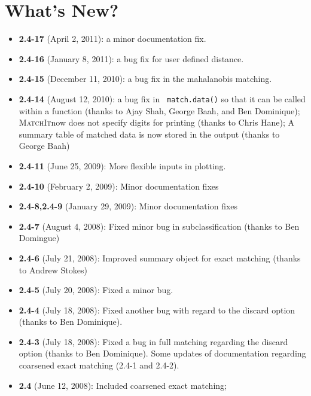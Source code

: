 \documentclass[oneside,letterpaper,12pt]{book}
\newcommand{\MatchIt}{\textsc{MatchIt}}
\begin{document}









\chapter{What's New?}

\begin{itemize}
\item \textbf{2.4-17} (April 2, 2011): a minor documentation fix.
\item \textbf{2.4-16} (January 8, 2011): a bug fix for user defined distance.
\item \textbf{2.4-15} (December 11, 2010): a bug fix in the
  mahalanobis matching.
\item \textbf{2.4-14} (August 12, 2010): a bug fix in {\tt
    match.data()} so that it can be called within a function (thanks
  to Ajay Shah, George Baah, and Ben Dominique); \MatchIt now does not
  specify digits for printing (thanks to Chris Hane); A summary table
  of matched data is now stored in the output (thanks to George Baah)
\item \textbf{2.4-11} (June 25, 2009): More flexible inputs in
  plotting.
\item \textbf{2.4-10} (February 2, 2009): Minor documentation fixes
\item \textbf{2.4-8,2.4-9} (January 29, 2009): Minor documentation fixes
\item \textbf{2.4-7} (August 4, 2008): Fixed minor bug in subclassification 
(thanks to Ben Domingue)
\item \textbf{2.4-6} (July 21, 2008): Improved summary object for
  exact matching (thanks to Andrew Stokes)
\item \textbf{2.4-5} (July 20, 2008): Fixed a minor bug.
\item \textbf{2.4-4} (July 18, 2008): Fixed another bug with regard to the discard option (thanks to Ben Dominique).
\item \textbf{2.4-3} (July 18, 2008): Fixed a bug in full matching
  regarding the discard option (thanks to Ben Dominique). Some updates
  of documentation regarding coarsened exact matching (2.4-1 and
  2.4-2).
\item \textbf{2.4} (June 12, 2008): Included coarsened exact matching;

\end{itemize}
\end{document}
